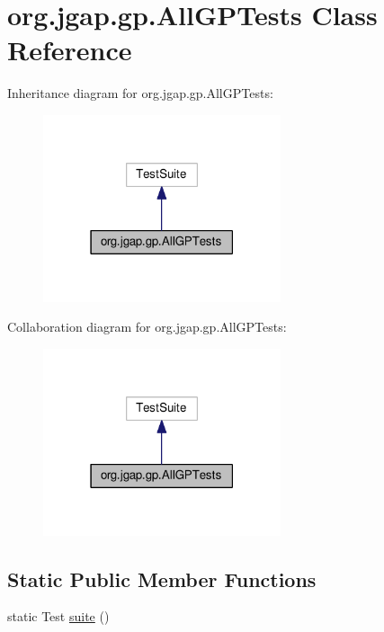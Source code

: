 \hypertarget{classorg_1_1jgap_1_1gp_1_1_all_g_p_tests}{\section{org.\-jgap.\-gp.\-All\-G\-P\-Tests Class Reference}
\label{classorg_1_1jgap_1_1gp_1_1_all_g_p_tests}
}


Inheritance diagram for org.\-jgap.\-gp.\-All\-G\-P\-Tests\-:
\nopagebreak
\begin{figure}[H]
\begin{center}
\leavevmode
\includegraphics[width=198pt]{classorg_1_1jgap_1_1gp_1_1_all_g_p_tests__inherit__graph}
\end{center}
\end{figure}


Collaboration diagram for org.\-jgap.\-gp.\-All\-G\-P\-Tests\-:
\nopagebreak
\begin{figure}[H]
\begin{center}
\leavevmode
\includegraphics[width=198pt]{classorg_1_1jgap_1_1gp_1_1_all_g_p_tests__coll__graph}
\end{center}
\end{figure}
\subsection*{Static Public Member Functions}
\begin{DoxyCompactItemize}
\item 
static Test \hyperlink{classorg_1_1jgap_1_1gp_1_1_all_g_p_tests_aa6fb0449a691215bef6c1f419bdc845d}{suite} ()
\end{DoxyCompactItemize}
